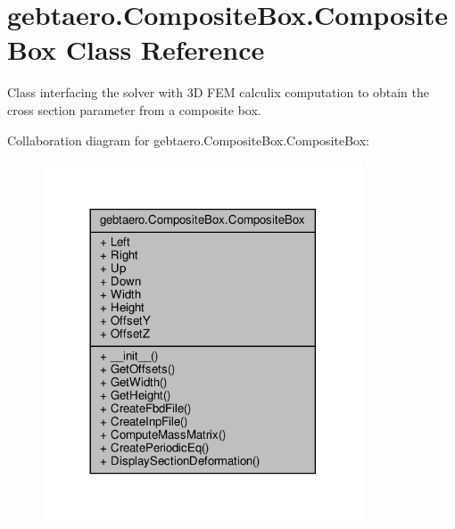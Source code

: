 \hypertarget{classgebtaero_1_1_composite_box_1_1_composite_box}{}\section{gebtaero.\+Composite\+Box.\+Composite\+Box Class Reference}
\label{classgebtaero_1_1_composite_box_1_1_composite_box}


Class interfacing the solver with 3D F\+EM calculix computation to obtain the cross section parameter from a composite box.  




Collaboration diagram for gebtaero.\+Composite\+Box.\+Composite\+Box\+:\nopagebreak
\begin{figure}[H]
\begin{center}
\leavevmode
\includegraphics[width=269pt]{classgebtaero_1_1_composite_box_1_1_composite_box__coll__graph}
\end{center}
\end{figure}
